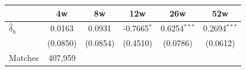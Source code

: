 \begin{tabular}{l*{5}{c}}
\toprule
 & 4w & 8w & 12w & 26w & 52w \\
\midrule
$\hat{\delta}_h$ & 0.0163 & 0.0931 & -0.7665$^{*}$ & 0.6254$^{***}$ & 0.2694$^{***}$ \\
 & (0.0850) & (0.0854) & (0.4510) & (0.0786) & (0.0612) \\
\midrule
Matches & 407,959 \\
\bottomrule
\end{tabular}
